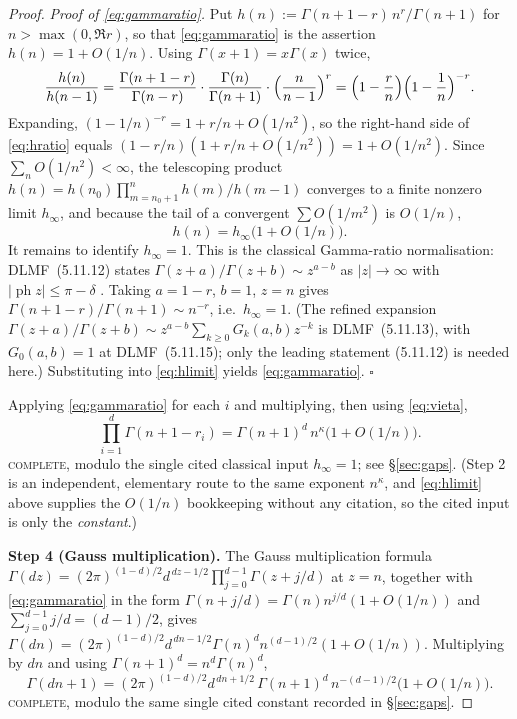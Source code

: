 \documentclass[11pt]{article}
\theoremstyle{definition}
\begin{document}
\begin{proof}
\emph{Proof of \eqref{eq:gammaratio}.} Put
$h(n):=\Gamma(n+1-r)\,n^{r}/\Gamma(n+1)$ for $n>\max(0,\Re r)$, so that
\eqref{eq:gammaratio} is the assertion $h(n)=1+O(1/n)$. Using
$\Gamma(x+1)=x\Gamma(x)$ twice,
\begin{equation}\label{eq:hratio}
\frac{h(n)}{h(n-1)}
=\frac{\Gamma(n+1-r)}{\Gamma(n-r)}\cdot\frac{\Gamma(n)}{\Gamma(n+1)}
\cdot\Bigl(\frac{n}{n-1}\Bigr)^{r}
=\Bigl(1-\frac{r}{n}\Bigr)\Bigl(1-\frac1n\Bigr)^{-r} .
\end{equation}
Expanding, $(1-1/n)^{-r}=1+r/n+O(1/n^{2})$, so the right-hand side of
\eqref{eq:hratio} equals $(1-r/n)(1+r/n+O(1/n^2))=1+O(1/n^{2})$. Since
$\sum_n O(1/n^2)<\infty$, the telescoping product
$h(n)=h(n_0)\prod_{m=n_0+1}^{n}h(m)/h(m-1)$ converges to a finite nonzero limit
$h_\infty$, and because the tail of a convergent $\sum O(1/m^{2})$ is $O(1/n)$,
\begin{equation}\label{eq:hlimit}
h(n)=h_\infty\bigl(1+O(1/n)\bigr).
\end{equation}
It remains to identify $h_\infty=1$. This is the classical Gamma-ratio
normalisation: DLMF~(5.11.12) states
$\Gamma(z+a)/\Gamma(z+b)\sim z^{a-b}$ as
$|z|\to\infty$ with $|\operatorname{ph}z|\le\pi-\delta$
\cite[\S5.11(iii)]{DLMF}. Taking $a=1-r$, $b=1$, $z=n$ gives
$\Gamma(n+1-r)/\Gamma(n+1)\sim n^{-r}$, i.e.\ $h_\infty=1$. (The refined
expansion $\Gamma(z+a)/\Gamma(z+b)\sim z^{a-b}\sum_{k\ge0}G_k(a,b)z^{-k}$ is
DLMF~(5.11.13), with $G_0(a,b)=1$ at DLMF~(5.11.15); only the leading statement
(5.11.12) is needed here.) Substituting into
\eqref{eq:hlimit} yields \eqref{eq:gammaratio}. \hfill$\square$

Applying \eqref{eq:gammaratio} for each $i$ and multiplying, then using
\eqref{eq:vieta},
\begin{equation}\label{eq:prodgamma}
\prod_{i=1}^{d}\Gamma(n+1-r_i)=\Gamma(n+1)^{d}\,n^{\kappa}\bigl(1+O(1/n)\bigr).
\end{equation}
\textsc{complete}, modulo the single cited classical input $h_\infty=1$; see
\S\ref{sec:gaps}. (Step 2 is an independent, elementary route to the same
exponent $n^{\kappa}$, and \eqref{eq:hlimit} above supplies the $O(1/n)$
bookkeeping without any citation, so the cited input is only the
\emph{constant}.)

\medskip\noindent\textbf{Step 4 (Gauss multiplication).}
The Gauss multiplication formula
$\Gamma(dz)=(2\pi)^{(1-d)/2}d^{\,dz-1/2}\prod_{j=0}^{d-1}\Gamma(z+j/d)$ at
$z=n$, together with \eqref{eq:gammaratio} in the form
$\Gamma(n+j/d)=\Gamma(n)n^{j/d}(1+O(1/n))$ and
$\sum_{j=0}^{d-1}j/d=(d-1)/2$, gives
$\Gamma(dn)=(2\pi)^{(1-d)/2}d^{\,dn-1/2}\Gamma(n)^{d}n^{(d-1)/2}(1+O(1/n))$.
Multiplying by $dn$ and using $\Gamma(n+1)^d=n^d\Gamma(n)^d$,
\begin{equation}\label{eq:gauss}
\Gamma(dn+1)=(2\pi)^{(1-d)/2}d^{\,dn+1/2}\,\Gamma(n+1)^{d}\,n^{-(d-1)/2}
\bigl(1+O(1/n)\bigr).
\end{equation}
\textsc{complete}, modulo the same single cited constant recorded in
\S\ref{sec:gaps}.


\end{proof}
\end{document}
